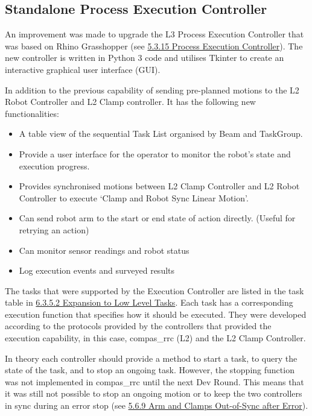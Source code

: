 \subsection{Standalone Process Execution Controller}

An improvement was made to upgrade the L3 Process Execution Controller that was based on Rhino Grasshopper (see \ul{5.3.15 Process Execution Controller}). The new controller is written in Python 3 code and utilises Tkinter to create an interactive graphical user interface (GUI).




In addition to the previous capability of sending pre-planned motions to the L2 Robot Controller and L2 Clamp controller. It has the following new functionalities:

\begin{itemize}
	\item A table view of the sequential Task List organised by Beam and TaskGroup. 

	\item Provide a user interface for the operator to monitor the robot's state and execution progress.

	\item Provides synchronised motions between L2 Clamp Controller and L2 Robot Controller to execute ‘Clamp and Robot Sync Linear Motion’.

	\item Can send robot arm to the start or end state of action directly. (Useful for retrying an action)

	\item Can monitor sensor readings and robot status

	\item Log execution events and surveyed results

\end{itemize}
The tasks that were supported by the Execution Controller are listed in the task table in \ul{6.3.5.2 Expansion to Low Level Tasks}. Each task has a corresponding execution function that specifies how it should be executed. They were developed according to the protocols provided by the controllers that provided the execution capability, in this case, compas\_rrc (L2) and the L2 Clamp Controller. 

In theory each controller should provide a method to start a task, to query the state of the task, and to stop an ongoing task. However, the stopping function was not implemented in compas\_rrc until the next Dev Round. This means that it was still not possible to stop an ongoing motion or to keep the two controllers in sync during an error stop (see \ul{5.6.9 Arm and Clamps Out-of-Sync after Error}).

